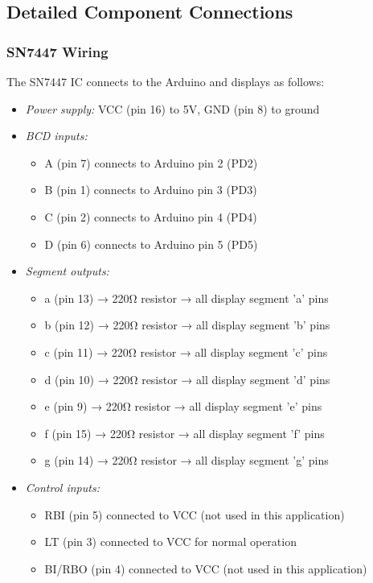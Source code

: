 \documentclass{article}
\begin{document}
\subsection{Detailed Component Connections}

\subsubsection{SN7447 Wiring}
The SN7447 IC connects to the Arduino and displays as follows:
\begin{itemize}
\item \textit{Power supply:} VCC (pin 16) to 5V, GND (pin 8) to ground
\item \textit{BCD inputs:}
  \begin{itemize}
  \item A (pin 7) connects to Arduino pin 2 (PD2)
  \item B (pin 1) connects to Arduino pin 3 (PD3)
  \item C (pin 2) connects to Arduino pin 4 (PD4)
  \item D (pin 6) connects to Arduino pin 5 (PD5)
  \end{itemize}
\item \textit{Segment outputs:}
  \begin{itemize}
  \item a (pin 13) → 220Ω resistor → all display segment 'a' pins
  \item b (pin 12) → 220Ω resistor → all display segment 'b' pins
  \item c (pin 11) → 220Ω resistor → all display segment 'c' pins
  \item d (pin 10) → 220Ω resistor → all display segment 'd' pins
  \item e (pin 9) → 220Ω resistor → all display segment 'e' pins
  \item f (pin 15) → 220Ω resistor → all display segment 'f' pins
  \item g (pin 14) → 220Ω resistor → all display segment 'g' pins
  \end{itemize}
\item \textit{Control inputs:}
  \begin{itemize}
  \item RBI (pin 5) connected to VCC (not used in this application)
  \item LT (pin 3) connected to VCC for normal operation
  \item BI/RBO (pin 4) connected to VCC (not used in this application)
  \end{itemize}
\end{itemize}
\end{document}
